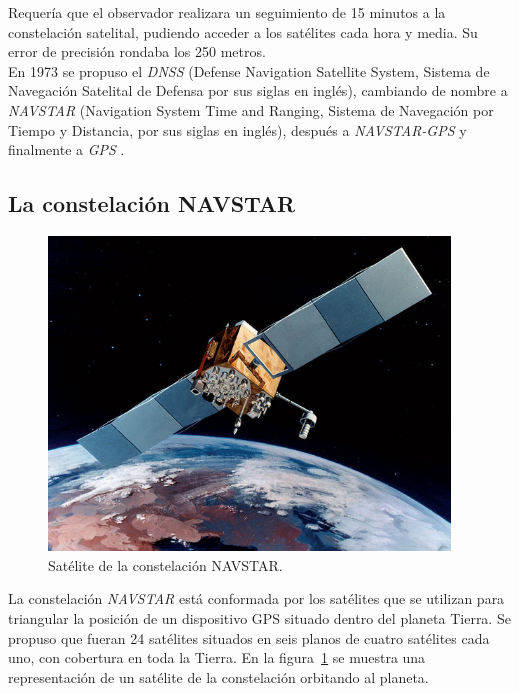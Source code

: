 Requería que el observador realizara un seguimiento de 15 minutos a la constelación satelital, pudiendo acceder a los satélites cada hora y media. Su error de precisión rondaba los 250 metros.\\

En 1973 se propuso el \textit{DNSS} (Defense Navigation Satellite System, Sistema de Navegación Satelital de Defensa por sus siglas en inglés), cambiando de nombre a \textit{NAVSTAR} (Navigation System Time and Ranging, Sistema de Navegación por Tiempo y Distancia, por sus siglas en inglés), después a \textit{NAVSTAR-GPS} y finalmente a \textit{GPS} \citep{termal2014prototipo}.

\subsection{La constelación NAVSTAR}

\begin{figure}[H]
\centering
\includegraphics[width=0.95\textwidth]{Figures/Navstar}
\caption[Satélite de la constelación NAVSTAR.]{Satélite de la constelación NAVSTAR\footnotemark.}
\label{fig:NAV}
\end{figure}


La constelación \textit{NAVSTAR} está conformada por los satélites que se utilizan para triangular la posición de un dispositivo GPS situado dentro del planeta Tierra. Se propuso que fueran 24 satélites situados en seis planos de cuatro satélites cada uno, con cobertura en toda la Tierra. En la figura~\ref{fig:NAV} se muestra una representación de un satélite de la constelación orbitando al planeta.\\

